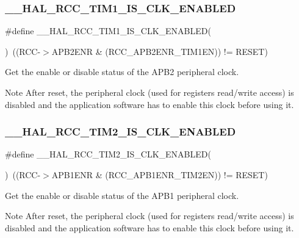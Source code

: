 \subsubsection{\texorpdfstring{\_\_HAL\_RCC\_TIM1\_IS\_CLK\_ENABLED}{\_\_HAL\_RCC\_TIM1\_IS\_CLK\_ENABLED}}
{\footnotesize\ttfamily \#define \+\_\+\+\_\+\+H\+A\+L\+\_\+\+R\+C\+C\+\_\+\+T\+I\+M1\+\_\+\+I\+S\+\_\+\+C\+L\+K\+\_\+\+E\+N\+A\+B\+L\+ED(\begin{DoxyParamCaption}{ }\end{DoxyParamCaption})~((R\+CC-\/$>$A\+P\+B2\+E\+NR \& (R\+C\+C\+\_\+\+A\+P\+B2\+E\+N\+R\+\_\+\+T\+I\+M1\+EN)) != R\+E\+S\+ET)}



Get the enable or disable status of the A\+P\+B2 peripheral clock. 

\begin{DoxyNote}{Note}
After reset, the peripheral clock (used for registers read/write access) is disabled and the application software has to enable this clock before using it. 
\end{DoxyNote}
\mbox{\label{group___r_c_c_ex___peripheral___clock___enable___disable___status_gadee5016adb1c8b62a5bb05f055859de0}} 
\subsubsection{\texorpdfstring{\_\_HAL\_RCC\_TIM2\_IS\_CLK\_ENABLED}{\_\_HAL\_RCC\_TIM2\_IS\_CLK\_ENABLED}}
{\footnotesize\ttfamily \#define \+\_\+\+\_\+\+H\+A\+L\+\_\+\+R\+C\+C\+\_\+\+T\+I\+M2\+\_\+\+I\+S\+\_\+\+C\+L\+K\+\_\+\+E\+N\+A\+B\+L\+ED(\begin{DoxyParamCaption}{ }\end{DoxyParamCaption})~((R\+CC-\/$>$A\+P\+B1\+E\+NR \& (R\+C\+C\+\_\+\+A\+P\+B1\+E\+N\+R\+\_\+\+T\+I\+M2\+EN)) != R\+E\+S\+ET)}



Get the enable or disable status of the A\+P\+B1 peripheral clock. 

\begin{DoxyNote}{Note}
After reset, the peripheral clock (used for registers read/write access) is disabled and the application software has to enable this clock before using it. 
\end{DoxyNote}
